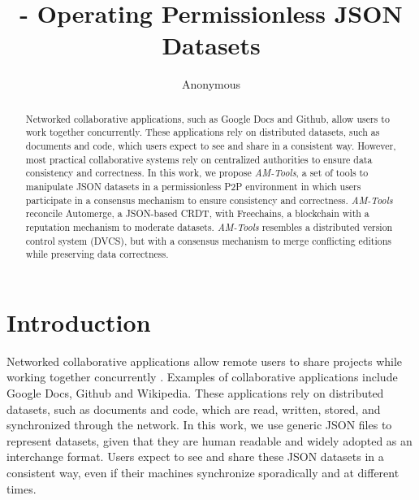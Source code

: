 \documentclass[12pt]{article}
\title{
    \AMT - Operating Permissionless JSON Datasets
}
\author{Anonymous}
\newcommand{\AMT}      {\emph{AM-Tools}\xspace}
\begin{document}

\maketitle

\begin{abstract}
Networked collaborative applications, such as Google Docs and Github, allow
users to work together concurrently.
These applications rely on distributed datasets, such as documents and code,
which users expect to see and share in a consistent way.
However, most practical collaborative systems rely on centralized authorities
to ensure data consistency and correctness.
%
In this work, we propose \AMT, a set of tools to manipulate JSON datasets in a
permissionless P2P environment in which users participate in a consensus
mechanism to ensure consistency and correctness.
%
\AMT reconcile Automerge, a JSON-based CRDT, with Freechains, a blockchain with
a reputation mechanism to moderate datasets.
%
\AMT resembles a distributed version control system (DVCS), but with a
consensus mechanism to merge conflicting editions while preserving data
correctness.
\end{abstract}

\section{Introduction}
\label{sec.introduction}

Networked collaborative applications allow remote users to share projects while
working together concurrently \cite{wu2010partial}.
Examples of collaborative applications include Google Docs, Github and
Wikipedia.
%
These applications rely on distributed datasets, such as documents and code,
which are read, written, stored, and synchronized through the network.
In this work, we use generic JSON files to represent datasets, given that they
are human readable and widely adopted as an interchange format.
Users expect to see and share these JSON datasets in a consistent way, even if
their machines synchronize sporadically and at different times.
\end{document}
